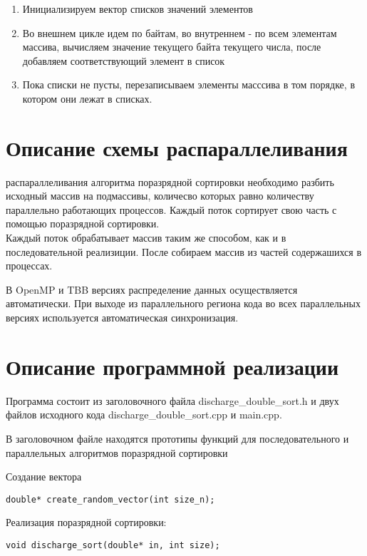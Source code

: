 \documentclass{report}
\begin{document}
\begin{enumerate}
\item Инициализируем вектор списков значений элементов
\item Во внешнем  цикле идем по байтам, во внутреннем - по всем элементам массива, вычисляем значение текущего байта текущего числа, после добавляем соответствующий элемент в список
\item Пока списки не пусты, перезаписываем элементы масссива в том порядке, в котором они лежат в списках.
 
\end{enumerate}
\newpage

\section*{Описание схемы распараллеливания}
 распараллеливания алгоритма поразрядной сортировки необходимо разбить исходный массив на подмассивы, количесво которых равно количеству параллельно работающих процессов. Каждый поток сортирует свою часть с помощью поразрядной сортировки. \\
Каждый поток обрабатывает массив таким же способом, как и в последовательной реализиции. После собираем массив из частей содержашихся в процессах.

\par В OpenMP и TBB версиях распределение данных осуществляется автоматически. При выходе из параллельного региона кода во всех параллельных версиях используется автоматическая синхронизация.

\newpage

\section*{Описание программной реализации}
Программа состоит из заголовочного файла discharge\_double\_sort.h и двух файлов исходного кода  discharge\_double\_sort.cpp и main.cpp.
\par В заголовочном файле находятся прототипы функций для последовательного и параллельных алгоритмов поразрядной сортировки
\par Создание вектора \par
\begin{lstlisting}
double* create_random_vector(int size_n);
\end{lstlisting}
\par Реализация поразрядной сортировки:
\begin{lstlisting}
void discharge_sort(double* in, int size);
  \end{lstlisting}
\end{document}
